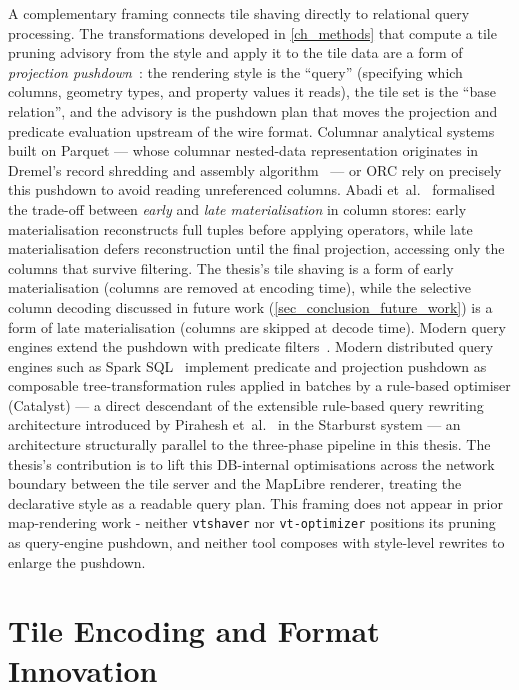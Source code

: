 A complementary framing connects tile shaving directly to relational query processing.
The transformations developed in \cref{ch_methods} that compute a tile pruning advisory from the style and apply it to the tile data are a form of \emph{projection pushdown}~\cite{graefeQueryEvaluationTechniques1993}: the rendering style is the \enquote{query} (specifying which columns, geometry types, and property values it reads), the tile set is the \enquote{base relation}, and the advisory is the pushdown plan that moves the projection and predicate evaluation upstream of the wire format.
Columnar analytical systems built on Parquet --- whose columnar nested-data representation originates in Dremel's record shredding and assembly algorithm~\cite{melnikDremelInteractiveAnalysis2010} --- or ORC rely on precisely this pushdown to avoid reading unreferenced columns.
Abadi et~al.~\cite{abadiMaterializationStrategiesColumn2007} formalised the trade-off between \emph{early} and \emph{late materialisation} in column stores: early materialisation reconstructs full tuples before applying operators, while late materialisation defers reconstruction until the final projection, accessing only the columns that survive filtering.
The thesis's tile shaving is a form of early materialisation (columns are removed at encoding time), while the selective column decoding discussed in future work (\cref{sec_conclusion_future_work}) is a form of late materialisation (columns are skipped at decode time).
Modern query engines extend the pushdown with predicate filters~\cite{abadiDesignImplementationModern2013}.
Modern distributed query engines such as Spark SQL~\cite{armbrustSparkSQLRelational2015} implement predicate and projection pushdown as composable tree-transformation rules applied in batches by a rule-based optimiser (Catalyst) --- a direct descendant of the extensible rule-based query rewriting architecture introduced by Pirahesh et~al.~\cite{piraheshExtensibleRuleBasedQuery1992} in the Starburst system --- an architecture structurally parallel to the three-phase pipeline in this thesis.
The thesis's contribution is to lift this DB-internal optimisations across the network boundary between the tile server and the MapLibre renderer, treating the declarative style as a readable query plan.
This framing does not appear in prior map-rendering work - neither \texttt{vtshaver} nor \texttt{vt-optimizer} positions its pruning as query-engine pushdown, and neither tool composes with style-level rewrites to enlarge the pushdown.

\section{Tile Encoding and Format Innovation}\label{sec_rw_tile_encoding}

